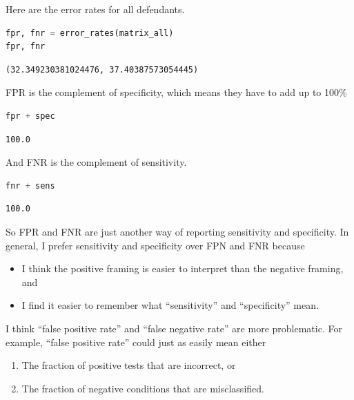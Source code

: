 Here are the error rates for all defendants.

\begin{lstlisting}[language=Python,style=source]
fpr, fnr = error_rates(matrix_all)
fpr, fnr
\end{lstlisting}

\begin{lstlisting}[style=output]
(32.349230381024476, 37.40387573054445)
\end{lstlisting}

FPR is the complement of specificity, which means they have to add up to
100\%

\begin{lstlisting}[language=Python,style=source]
fpr + spec
\end{lstlisting}

\begin{lstlisting}[style=output]
100.0
\end{lstlisting}

And FNR is the complement of sensitivity.

\begin{lstlisting}[language=Python,style=source]
fnr + sens
\end{lstlisting}

\begin{lstlisting}[style=output]
100.0
\end{lstlisting}

So FPR and FNR are just another way of reporting sensitivity and
specificity. In general, I prefer sensitivity and specificity over FPN
and FNR because

\begin{itemize}
\item
  I think the positive framing is easier to interpret than the negative
  framing, and
\item
  I find it easier to remember what ``sensitivity'' and ``specificity''
  mean.
\end{itemize}

I think ``false positive rate'' and ``false negative rate'' are more
problematic. For example, ``false positive rate'' could just as easily
mean either

\begin{enumerate}
\def\labelenumi{\arabic{enumi}.}
\item
  The fraction of positive tests that are incorrect, or
\item
  The fraction of negative conditions that are misclassified.
\end{enumerate}

